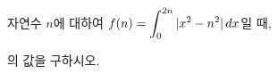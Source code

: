 자연수 $n$에 대하여 $f(n)=\displaystyle\int_{0}^{2n} |x^2-n^2|\mkern3mu dx$일 때, \par\smallskip{}\par\smallskip\noindent 의 값을 구하시오.
